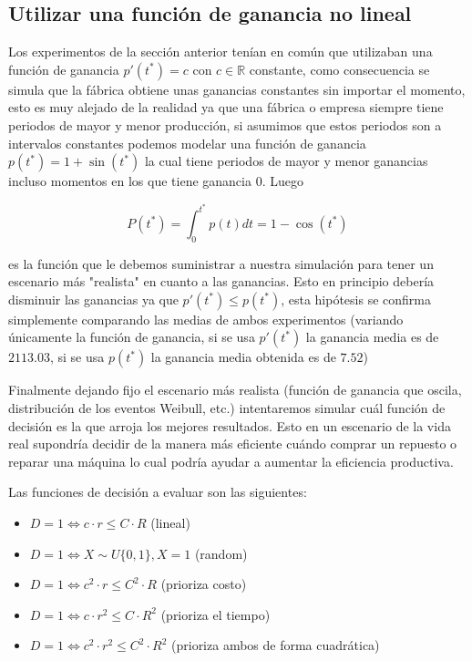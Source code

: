 \documentclass[10pt,twocolumn]{article}
\begin{document}
\subsection{Utilizar una función de ganancia no lineal}

Los experimentos de la sección anterior tenían en común que utilizaban una función de ganancia $p\prime(t^{*}) = c$ con $c \in \mathbb{R}$ constante, como consecuencia se simula que la fábrica obtiene unas ganancias constantes sin importar el momento, esto es muy alejado de la realidad ya que una fábrica o empresa siempre tiene periodos de mayor y menor producción, si asumimos que estos periodos son a intervalos constantes podemos modelar una función de ganancia $p(t^{*}) = 1 + \sin(t^{*})$ la cual tiene periodos de mayor y menor ganancias incluso momentos en los que tiene ganancia $0$. Luego 

$$
P(t^{*}) = \int_{0}^{t^{*}} {p(t)dt} = 1 - \cos(t^{*})
$$

es la función que le debemos suministrar a nuestra simulación para tener un escenario más "realista" en cuanto a las ganancias. Esto en principio debería disminuir las ganancias ya que $p\prime(t^{*}) \leq p(t^{*})$, esta hipótesis se confirma simplemente comparando las medias de ambos experimentos (variando únicamente la función de ganancia, si se usa $p\prime(t^{*})$ la ganancia media es de $2113.03$, si se usa $p(t^{*})$ la ganancia media obtenida es de $7.52$)

Finalmente dejando fijo el escenario más realista (función de ganancia que oscila, distribución de los eventos Weibull, etc.) intentaremos simular cuál función de decisión es la que arroja los mejores resultados. Esto en un escenario de la vida real supondría decidir de la manera más eficiente cuándo comprar un repuesto o reparar una máquina lo cual podría ayudar a aumentar la eficiencia productiva.

Las funciones de decisión a evaluar son las siguientes:

\begin{itemize}
    \item $D = 1 \Leftrightarrow c \cdot r \leq C \cdot R$ (lineal)
    \item $D = 1 \Leftrightarrow X \sim  U\{0,1\}, X = 1$ (random)
    \item $D = 1 \Leftrightarrow c^{2} \cdot r \leq C^{2} \cdot R$ (prioriza costo)
    \item $D = 1 \Leftrightarrow c \cdot r^{2} \leq C \cdot R^{2}$ (prioriza el tiempo)
    \item $D = 1 \Leftrightarrow c^{2} \cdot r^{2} \leq C^{2} \cdot R^{2}$ (prioriza ambos de forma cuadrática)
\end{itemize}
\end{document}
